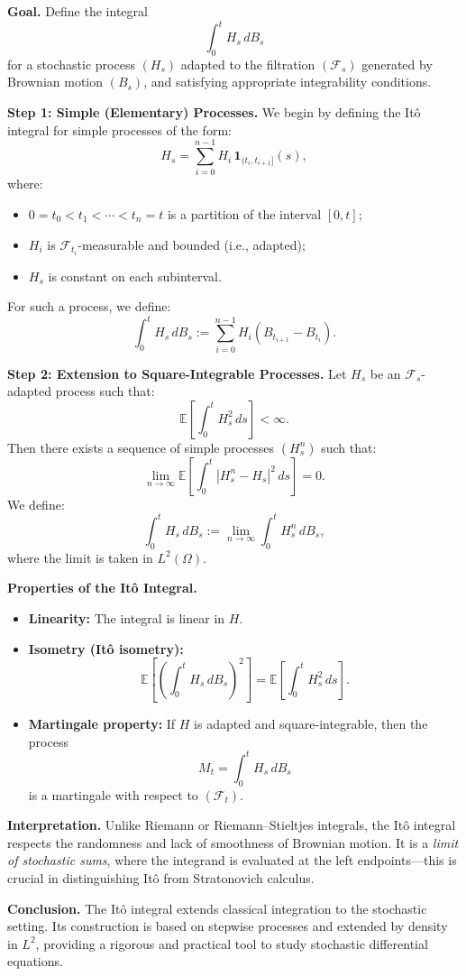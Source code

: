 
\textbf{Goal.}  
Define the integral
\[
\int_0^t H_s \, dB_s
\]
for a stochastic process \( (H_s) \) adapted to the filtration \( (\mathcal{F}_s) \) generated by Brownian motion \( (B_s) \), and satisfying appropriate integrability conditions.

\vspace{1em}
\textbf{Step 1: Simple (Elementary) Processes.}  
We begin by defining the Itô integral for simple processes of the form:
\[
H_s = \sum_{i=0}^{n-1} H_i \, \mathbf{1}_{(t_i, t_{i+1}]}(s),
\]
where:
\begin{itemize}
  \item \( 0 = t_0 < t_1 < \cdots < t_n = t \) is a partition of the interval \([0, t]\);
  \item \( H_i \) is \( \mathcal{F}_{t_i} \)-measurable and bounded (i.e., adapted);
  \item \( H_s \) is constant on each subinterval.
\end{itemize}

For such a process, we define:
\[
\int_0^t H_s \, dB_s := \sum_{i=0}^{n-1} H_i (B_{t_{i+1}} - B_{t_i}).
\]

\vspace{1em}
\textbf{Step 2: Extension to Square-Integrable Processes.}  
Let \( H_s \) be an \( \mathcal{F}_s \)-adapted process such that:
\[
\mathbb{E} \left[ \int_0^t H_s^2 \, ds \right] < \infty.
\]
Then there exists a sequence of simple processes \( (H^n_s) \) such that:
\[
\lim_{n \to \infty} \mathbb{E} \left[ \int_0^t |H^n_s - H_s|^2 \, ds \right] = 0.
\]
We define:
\[
\int_0^t H_s \, dB_s := \lim_{n \to \infty} \int_0^t H^n_s \, dB_s,
\]
where the limit is taken in \( L^2(\Omega) \).

\vspace{1em}
\textbf{Properties of the Itô Integral.}
\begin{itemize}
  \item \textbf{Linearity:} The integral is linear in \( H \).
  \item \textbf{Isometry (Itô isometry):}
  \[
  \mathbb{E} \left[ \left( \int_0^t H_s \, dB_s \right)^2 \right] = \mathbb{E} \left[ \int_0^t H_s^2 \, ds \right].
  \]
  \item \textbf{Martingale property:} If \( H \) is adapted and square-integrable, then the process
  \[
  M_t = \int_0^t H_s \, dB_s
  \]
  is a martingale with respect to \( (\mathcal{F}_t) \).
\end{itemize}

\vspace{1em}
\textbf{Interpretation.}  
Unlike Riemann or Riemann–Stieltjes integrals, the Itô integral respects the randomness and lack of smoothness of Brownian motion. It is a \textit{limit of stochastic sums}, where the integrand is evaluated at the left endpoints—this is crucial in distinguishing Itô from Stratonovich calculus.

\textbf{Conclusion.}  
The Itô integral extends classical integration to the stochastic setting. Its construction is based on stepwise processes and extended by density in \( L^2 \), providing a rigorous and practical tool to study stochastic differential equations.